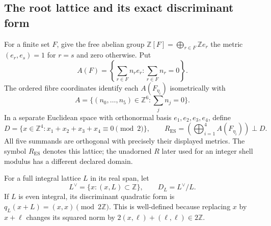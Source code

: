 \subsection{The root lattice and its exact discriminant form}
\label{esn:subsec:root-and-discriminant}

For a finite set \(F\), give the free abelian group
\(\mathbb Z[F]=\bigoplus_{r\in F}\mathbb Ze_r\) the metric
\((e_r,e_s)=1\) for \(r=s\) and zero otherwise.  Put
\[
 A(F)=\left\{\sum_{r\in F}n_re_r:\sum_{r\in F}n_r=0\right\}.
\]
The ordered fibre coordinates identify each \(A(F_{\eta_i})\)
isometrically with
\[
 A=\{(n_0,\ldots,n_5)\in\mathbb Z^6:\textstyle\sum_j n_j=0\}.
\]
In a separate Euclidean space with orthonormal basis
\(e_1,e_2,e_3,e_4\), define
\begin{equation}
 D=\{x\in\mathbb Z^4:x_1+x_2+x_3+x_4\equiv0\pmod2\},
 \qquad R_{\mathrm{ES}}=
       \left(\bigoplus_{i=1}^4 A(F_{\eta_i})\right)\mathbin{\perp}D.
 \label{esn:eq:root-lattice}
\end{equation}
All five summands are orthogonal with precisely their displayed metrics.
The symbol \(R_{\mathrm{ES}}\) denotes this lattice; the unadorned
\(R\) later used for an integer shell modulus has a different declared
domain.

For a full integral lattice \(L\) in its real span, let
\[
 L^\vee=\{x:(x,L)\subset\mathbb Z\},\qquad D_L=L^\vee/L.
\]
If \(L\) is even integral, its discriminant quadratic form is
\(q_L(x+L)=(x,x)\pmod {2\mathbb Z}\).  This is well-defined because
replacing \(x\) by \(x+\ell\) changes its squared norm by
\(2(x,\ell)+(\ell,\ell)\in2\mathbb Z\).

